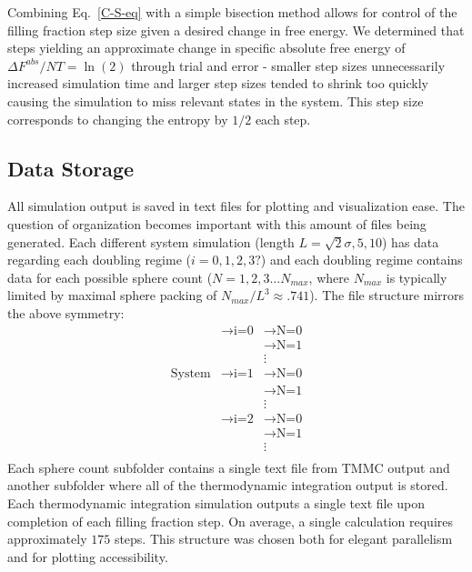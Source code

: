 \documentclass[12pt]{article}
\newcommand{\ignore}[1]{}
\begin{document}
Combining Eq.~\ref{C-S-eq} with a simple bisection method allows for control of the filling fraction step size given a desired change in free energy. We determined that steps yielding an approximate change in specific absolute free energy of $\Delta F^{abs}/NT = \ln(2)$ through trial and error - smaller step sizes unnecessarily increased simulation time and larger step sizes tended to shrink too quickly causing the simulation to miss relevant states in the system. This step size corresponds to changing the entropy by $1/2$ each step. 

\ignore{NB: is there a more physical reason we chose this filling fraction increase?}

\subsection{Data Storage}
All simulation output is saved in text files for plotting and visualization ease. The question of organization becomes important with this amount of files being generated. Each different system simulation (length $L = \sqrt2 \sigma, 5,10$) has data regarding each doubling regime ($i=0,1,2,3?$) and each doubling regime contains data for each possible sphere count ($N=1,2,3\dots N_{max}$, where $N_{max}$ is typically limited by maximal sphere packing of $N_{max}/L^3\approx.741$). The file structure mirrors the above symmetry: 
\begin{align*}
                &\rightarrow \text{i=0} &\rightarrow \text{N=0}\\
                & &\rightarrow \text{N=1}\\
                && \vdots\\
\text{System} & \rightarrow \text{i=1} &\rightarrow \text{N=0}\\
                && \rightarrow \text{N=1}\\
                &&\vdots\\
                &\rightarrow \text{i=2} &\rightarrow \text{N=0}\\
                && \rightarrow \text{N=1}\\
                &&\vdots\\
\end{align*}
Each sphere count subfolder contains a single text file from TMMC output and another subfolder where all of the thermodynamic integration output is stored. Each thermodynamic integration simulation outputs a single text file upon completion of each filling fraction step. On average, a single calculation requires approximately $175$ steps. This structure was chosen both for elegant parallelism and for plotting accessibility. 
\end{document}

